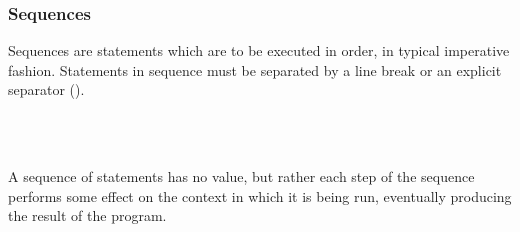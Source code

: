 \subsubsection{Sequences}

Sequences are statements which are to be executed in order, in typical
imperative fashion. Statements in sequence must be separated by a line break or
an explicit separator (\op{,}).

\begin{bnf*}
     \\
     \\
\end{bnf*}

A sequence of statements has no value, but rather each step of the sequence
performs some effect on the context in which it is being run, eventually
producing the result of the program.

\begin{prooftree}
\end{prooftree}

\begin{prooftree}
\end{prooftree}
